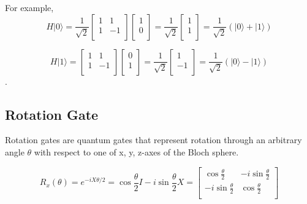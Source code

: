 For example,
\begin{equation}
H|0\rangle = \frac{1}{\sqrt{2}}\begin{bmatrix}
1 & 1\\
1 & -1 \\
\end{bmatrix}\left[
\begin{array}{c}
1 \\
0 \\
\end{array}
\right]
= \frac{1}{\sqrt{2}} \left[
\begin{array}{c}
1 \\
1 \\
\end{array}
\right]
= \frac{1}{\sqrt{2}} (|0\rangle + |1\rangle)
\end{equation}

\begin{equation}
H|1\rangle = \begin{bmatrix}
1 & 1\\
1 & -1 \\
\end{bmatrix} 
\left[
\begin{array}{c}
0 \\
1  \\
\end{array}
\right]
= \frac{1}{\sqrt{2}} \left[
\begin{array}{c}
1 \\
-1 \\
\end{array}
\right]
=\frac{1}{\sqrt{2}} (|0\rangle - |1\rangle)
\end{equation}.

\subsection{Rotation Gate}

Rotation gates are quantum gates that represent rotation through an arbitrary angle $\theta$ with respect to one of x, y, z-axes of the Bloch sphere.

\begin{equation}
  R_x(\theta) = e^{-iX\theta/2} = \cos \frac{\theta}{2}I - i \sin\frac{\theta}{2}X = \begin{bmatrix}
    \cos \frac{\theta}{2} & -i \sin \frac{\theta}{2} \\
    -i \sin \frac{\theta}{2} & \cos \frac{\theta}{2} \\
    \end{bmatrix} 
\end{equation}

